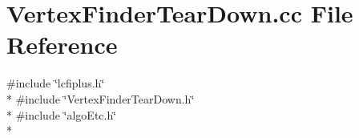 \section{Vertex\-Finder\-Tear\-Down.\-cc File Reference}
\label{VertexFinderTearDown_8cc}
{\ttfamily \#include \char`\"{}lcfiplus.\-h\char`\"{}}\\*
{\ttfamily \#include \char`\"{}Vertex\-Finder\-Tear\-Down.\-h\char`\"{}}\\*
{\ttfamily \#include \char`\"{}algo\-Etc.\-h\char`\"{}}\\*
